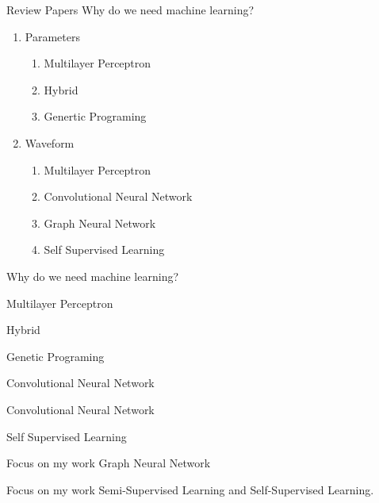 \documentclass{beamer}
\begin{document}
	\begin{frame}[t]{Review Papers}
		Why do we need machine learning?\\

		\vspace{10pt}
		\begin{enumerate}
			\item Parameters
			\begin{enumerate}
				\item Multilayer Perceptron
				\item Hybrid
				\item Genertic Programing
			\end{enumerate}
		\vspace{10pt}
			\item Waveform
			\begin{enumerate}
				\item Multilayer Perceptron
				\item Convolutional Neural Network
				\item Graph Neural Network
				\item Self Supervised Learning
			\end{enumerate}
		\end{enumerate}
	\end{frame}
	
	\begin{frame}[t]{Why do we need machine learning?}
		
	\end{frame}
	\begin{frame}[t]{Multilayer Perceptron}
	\end{frame}

	\begin{frame}[t]{Hybrid}
	\end{frame}

	\begin{frame}[t]{Genetic Programing}
	\end{frame}

	\begin{frame}[t]{Convolutional Neural Network}
	\end{frame}

	\begin{frame}[t]{Convolutional Neural Network}
	\end{frame}

	\begin{frame}[t]{Self Supervised Learning}
	\end{frame}

	\begin{frame}[t]{Focus on my work}
		Graph Neural Network
		
	\end{frame}

	\begin{frame}[t]{Focus on my work}
		Semi-Supervised Learning and Self-Supervised Learning.
	\end{frame}	
\end{document}
